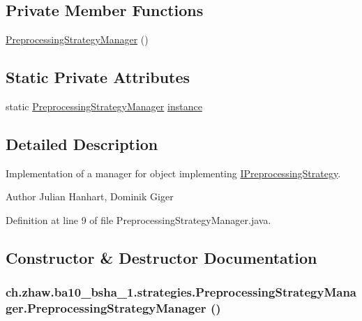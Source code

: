 \subsection*{Private Member Functions}
\begin{DoxyCompactItemize}
\item 
\hyperlink{classch_1_1zhaw_1_1ba10__bsha__1_1_1strategies_1_1PreprocessingStrategyManager_adb2315db6a6cb4c72840550cb2c34008}{PreprocessingStrategyManager} ()
\end{DoxyCompactItemize}
\subsection*{Static Private Attributes}
\begin{DoxyCompactItemize}
\item 
static \hyperlink{classch_1_1zhaw_1_1ba10__bsha__1_1_1strategies_1_1PreprocessingStrategyManager}{PreprocessingStrategyManager} \hyperlink{classch_1_1zhaw_1_1ba10__bsha__1_1_1strategies_1_1PreprocessingStrategyManager_aaaf08a9a23741085373f5b169191ac01}{instance}
\end{DoxyCompactItemize}


\subsection{Detailed Description}
Implementation of a manager for object implementing \hyperlink{interfacech_1_1zhaw_1_1ba10__bsha__1_1_1strategies_1_1IPreprocessingStrategy}{IPreprocessingStrategy}.

\begin{DoxyAuthor}{Author}
Julian Hanhart, Dominik Giger 
\end{DoxyAuthor}


Definition at line 9 of file PreprocessingStrategyManager.java.

\subsection{Constructor \& Destructor Documentation}
\hypertarget{classch_1_1zhaw_1_1ba10__bsha__1_1_1strategies_1_1PreprocessingStrategyManager_adb2315db6a6cb4c72840550cb2c34008}{
\subsubsection[{PreprocessingStrategyManager}]{\setlength{\rightskip}{0pt plus 5cm}ch.zhaw.ba10\_\-bsha\_\-1.strategies.PreprocessingStrategyManager.PreprocessingStrategyManager ()}}
\label{classch_1_1zhaw_1_1ba10__bsha__1_1_1strategies_1_1PreprocessingStrategyManager_adb2315db6a6cb4c72840550cb2c34008}


